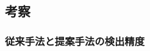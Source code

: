 \documentclass[submit]{ipsj}
\begin{document}
{%


\subsection{考察}\label{rq2:kousatu}


\subsubsection{従来手法と提案手法の検出精度}



}
\end{document}
